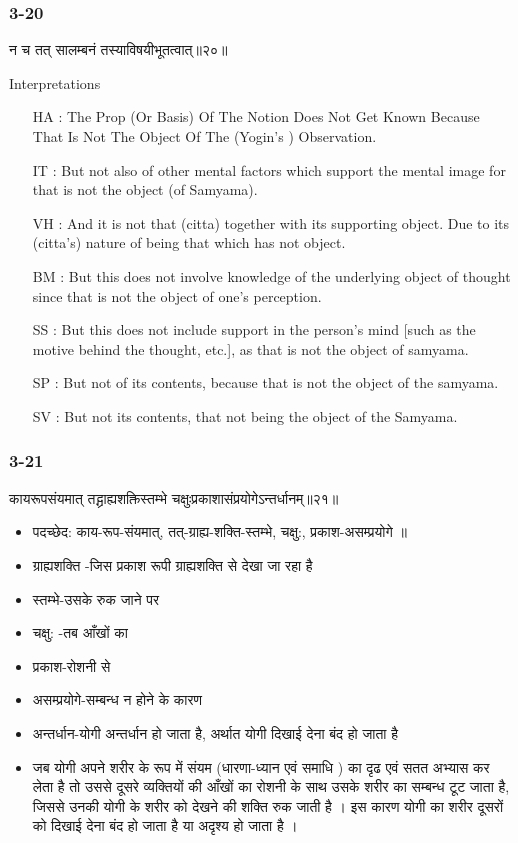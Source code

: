 \begin{frame}[fragile]\frametitle{3-20}
\begin{sanskrit}
न च तत् सालम्बनं तस्याविषयीभूतत्वात्॥२०॥
\end{sanskrit}

Interpretations
\begin{itemize}	
\item [HA]: The Prop (Or Basis) Of The Notion Does Not Get Known Because That Is Not The Object Of The (Yogin’s ) Observation.
\item [IT]: But not also of other mental factors which support the mental image for that is not the object (of Samyama).
\item [VH]: And it is not that (citta) together with its supporting object. Due to its (citta’s) nature of being that which has not object.
\item [BM]: But this does not involve knowledge of the underlying object of thought since that is not the object of one’s perception.
\item [SS]: But this does not include support in the person’s mind [such as the motive behind the thought, etc.], as that is not the object of samyama.
\item [SP]: But not of its contents, because that is not the object of the samyama.
\item [SV]: But not its contents, that not being the object of the Samyama. 
\end{itemize}
\end{frame}

\begin{frame}[fragile]\frametitle{3-21}
\begin{sanskrit}
कायरूपसंयमात् तद्ग्राह्यशक्तिस्तम्भे चक्षुःप्रकाशासंप्रयोगेऽन्तर्धानम्॥२१॥
\end{sanskrit}

\begin{itemize}
\item पदच्छेद:  काय-रूप-संयमात्, तत्-ग्राह्य-शक्ति-स्तम्भे, चक्षु:, प्रकाश-असम्प्रयोगे ॥
\item ग्राह्यशक्ति -जिस प्रकाश रूपी ग्राह्यशक्ति से देखा जा रहा है
\item स्तम्भे-उसके रुक जाने पर
\item चक्षु: -तब आँखों का
\item प्रकाश-रोशनी से
\item असम्प्रयोगे-सम्बन्ध न होने के कारण
\item अन्तर्धान-योगी अन्तर्धान हो जाता है, अर्थात योगी दिखाई देना बंद हो जाता है	
\item जब योगी अपने शरीर के रूप में संयम (धारणा-ध्यान एवं समाधि ) का दृढ एवं सतत अभ्यास  कर लेता है तो उससे दूसरे व्यक्तियों की आँखों का रोशनी के साथ उसके शरीर का सम्बन्ध टूट जाता है, जिससे उनकी योगी के शरीर को देखने की शक्ति रुक जाती है । इस कारण योगी का शरीर दूसरों को दिखाई देना बंद हो जाता है या अदृश्य हो जाता है ।
\end{itemize}
\end{frame}

